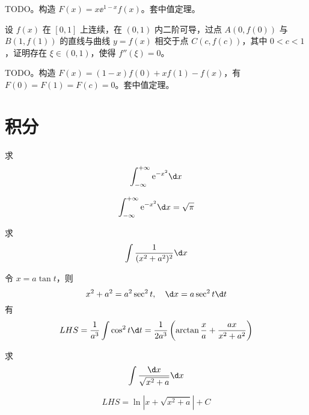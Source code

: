 \begin{solution}
	TODO。构造 $F(x) = x \ee^{1-x} f(x)$。套中值定理。
\end{solution}

\begin{problem}[000013]
	设 $f(x)$ 在 $[0, 1]$ 上连续，在 $(0, 1)$ 内二阶可导，过点 $A(0, f(0))$ 与 $B(1, f(1))$ 的直线与曲线 $y=f(x)$ 相交于点 $C(c, f(c))$，其中 $0 < c < 1$，证明存在 $\xi \in (0, 1)$，使得 $f''(\xi) = 0$。
\end{problem}

\begin{solution}
	TODO。构造 $F(x) = (1-x)f(0) + xf(1) - f(x)$，有 $F(0) = F(1) = F(c) = 0$。套中值定理。
\end{solution}

\section{积分}

\begin{problem}[000008]
	求
	\[ \int_{-\infty}^{+\infty} \ee^{-x^2}\d x \]
\end{problem}
\begin{solution}
	\[ \int_{-\infty}^{+\infty} \ee^{-x^2}\d x = \sqrt{\uppi} \]
\end{solution}

\begin{problem}[000014]
	求
	\[ \int \frac{1}{(x^2+a^2)^2} \d x \]
\end{problem}
\begin{solution}
	令 $x = a \tan t$，则
	\[ x^2 + a^2 = a^2 \sec^2 t, \quad \d x = a \sec^2 t \d t \]
	有
	\[ LHS =  \frac{1}{a^3}\int \cos^2 t \d t = \frac{1}{2a^3} \left( \arctan \frac{x}{a} + \frac{ax}{x^2+a^2} \right) \]
\end{solution}


\begin{problem}[000015]
	求
	\[ \int \frac{\d x}{\sqrt{x^2 + a}} \d x \]
\end{problem}
\begin{solution}
	\[ LHS =  \ln |x + \sqrt{x^2+a}| + C \]
\end{solution}
